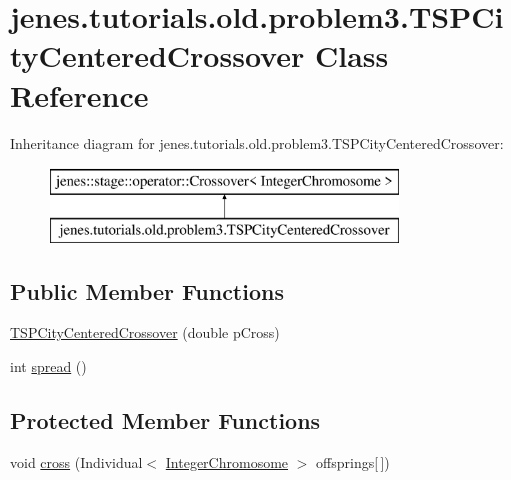 \hypertarget{classjenes_1_1tutorials_1_1old_1_1problem3_1_1_t_s_p_city_centered_crossover}{\section{jenes.\-tutorials.\-old.\-problem3.\-T\-S\-P\-City\-Centered\-Crossover Class Reference}
\label{classjenes_1_1tutorials_1_1old_1_1problem3_1_1_t_s_p_city_centered_crossover}
}
Inheritance diagram for jenes.\-tutorials.\-old.\-problem3.\-T\-S\-P\-City\-Centered\-Crossover\-:\begin{figure}[H]
\begin{center}
\leavevmode
\includegraphics[height=2.000000cm]{classjenes_1_1tutorials_1_1old_1_1problem3_1_1_t_s_p_city_centered_crossover}
\end{center}
\end{figure}
\subsection*{Public Member Functions}
\begin{DoxyCompactItemize}
\item 
\hyperlink{classjenes_1_1tutorials_1_1old_1_1problem3_1_1_t_s_p_city_centered_crossover_a1d89f8d326252c8c65c7abc11e486722}{T\-S\-P\-City\-Centered\-Crossover} (double p\-Cross)
\item 
int \hyperlink{classjenes_1_1tutorials_1_1old_1_1problem3_1_1_t_s_p_city_centered_crossover_a8e53f91513fd450e8852d22fb5afaf17}{spread} ()
\end{DoxyCompactItemize}
\subsection*{Protected Member Functions}
\begin{DoxyCompactItemize}
\item 
void \hyperlink{classjenes_1_1tutorials_1_1old_1_1problem3_1_1_t_s_p_city_centered_crossover_ad953284beb1ccab1a3eb78c37096a3fa}{cross} (Individual$<$ \hyperlink{classjenes_1_1chromosome_1_1_integer_chromosome}{Integer\-Chromosome} $>$ offsprings\mbox{[}$\,$\mbox{]})
\end{DoxyCompactItemize}

